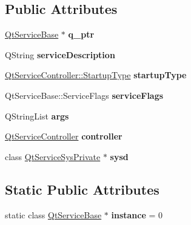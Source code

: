 \subsection*{Public Attributes}
\begin{DoxyCompactItemize}
\item 
\mbox{\label{class_qt_service_base_private_a3d7df7326eb36764f5311c58b086e973}} 
\hyperlink{class_qt_service_base}{Qt\+Service\+Base} $\ast$ {\bfseries q\+\_\+ptr}
\item 
\mbox{\label{class_qt_service_base_private_a3ad509ab3841b61bd30435d19b636712}} 
Q\+String {\bfseries service\+Description}
\item 
\mbox{\label{class_qt_service_base_private_a90e9a3f158cbeafd8fd336e03b46b364}} 
\hyperlink{class_qt_service_controller_a946ac2b079d9760503da923c2eaf0aac}{Qt\+Service\+Controller\+::\+Startup\+Type} {\bfseries startup\+Type}
\item 
\mbox{\label{class_qt_service_base_private_a2628f9a219995932e09d65708e0a1755}} 
Qt\+Service\+Base\+::\+Service\+Flags {\bfseries service\+Flags}
\item 
\mbox{\label{class_qt_service_base_private_a5f37fde173f2a524c191489b8ed8d7df}} 
Q\+String\+List {\bfseries args}
\item 
\mbox{\label{class_qt_service_base_private_abb527bd1c6933e4c947597c96198fe14}} 
\hyperlink{class_qt_service_controller}{Qt\+Service\+Controller} {\bfseries controller}
\item 
\mbox{\label{class_qt_service_base_private_a73030b7b6e1d0c3f6f8bbc96e0901751}} 
class \hyperlink{class_qt_service_sys_private}{Qt\+Service\+Sys\+Private} $\ast$ {\bfseries sysd}
\end{DoxyCompactItemize}
\subsection*{Static Public Attributes}
\begin{DoxyCompactItemize}
\item 
\mbox{\label{class_qt_service_base_private_ac33fafdd376bceb3365de00620da4f9d}} 
static class \hyperlink{class_qt_service_base}{Qt\+Service\+Base} $\ast$ {\bfseries instance} = 0
\end{DoxyCompactItemize}


